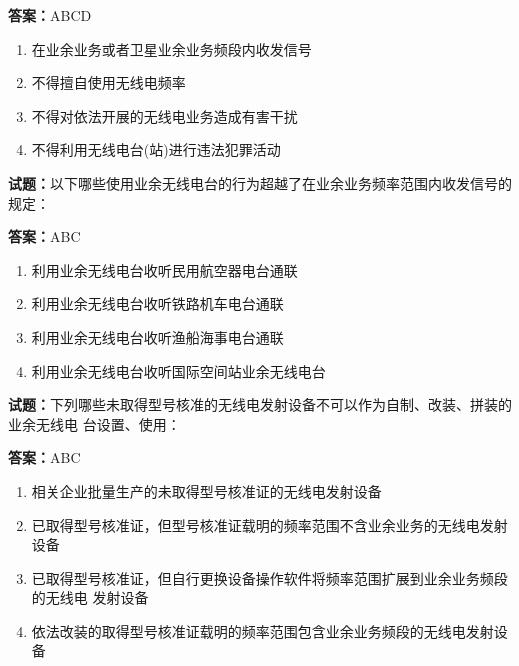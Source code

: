 \documentclass{ctexbook}
\begin{document}
\textbf{答案：}ABCD 

\begin{enumerate}[leftmargin=3em]
  \item 在业余业务或者卫星业余业务频段内收发信号 

  \item 不得擅自使用无线电频率 

  \item 不得对依法开展的无线电业务造成有害干扰 

  \item 不得利用无线电台(站)进行违法犯罪活动 

\end{enumerate}





\vspace{1em}

\textbf{试题：}以下哪些使用业余无线电台的行为超越了在业余业务频率范围内收发信号的规定： 

\textbf{答案：}ABC 

\begin{enumerate}[leftmargin=3em]
  \item 利用业余无线电台收听民用航空器电台通联 

  \item 利用业余无线电台收听铁路机车电台通联 

  \item 利用业余无线电台收听渔船海事电台通联 

  \item 利用业余无线电台收听国际空间站业余无线电台 

\end{enumerate}





\vspace{1em}

\textbf{试题：}下列哪些未取得型号核准的无线电发射设备不可以作为自制、改装、拼装的业余无线电
台设置、使用： 

\textbf{答案：}ABC 

\begin{enumerate}[leftmargin=3em]
  \item 相关企业批量生产的未取得型号核准证的无线电发射设备 

  \item 已取得型号核准证，但型号核准证载明的频率范围不含业余业务的无线电发射设备 

  \item 已取得型号核准证，但自行更换设备操作软件将频率范围扩展到业余业务频段的无线电
发射设备 

  \item 依法改装的取得型号核准证载明的频率范围包含业余业务频段的无线电发射设备 

\end{enumerate}
\end{document}
